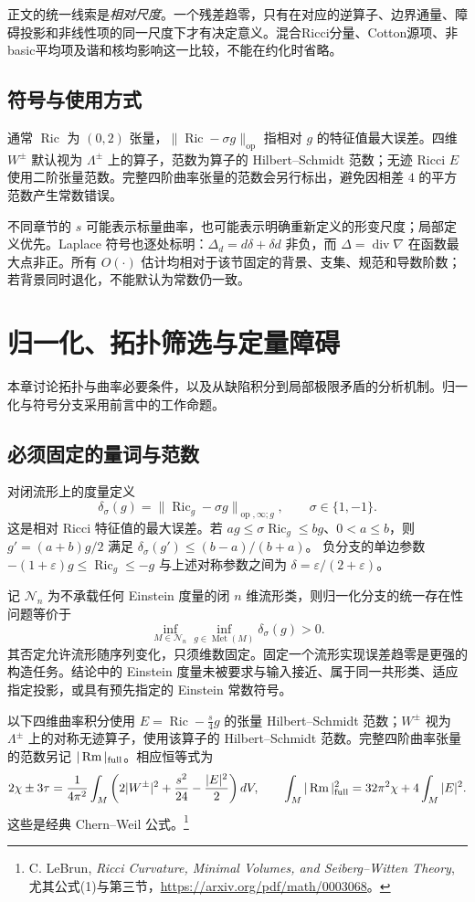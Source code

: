 \documentclass[UTF8,fontset=fandol,zihao=-4,oneside,openany]{ctexbook}
\theoremstyle{cjkplain}
\numberwithin{equation}{chapter}
\DeclareMathOperator{\Ric}{Ric}
\DeclareMathOperator{\Rm}{Rm}
\begin{document}
正文的统一线索是\emph{相对尺度}。一个残差趋零，只有在对应的逆算子、边界通量、障碍投影和非线性项的同一尺度下才有决定意义。混合Ricci分量、Cotton源项、非basic平均项及谐和核均影响这一比较，不能在约化时省略。

\section*{符号与使用方式}
通常 $\Ric$ 为 $(0,2)$ 张量，$\|\Ric-\sigma g\|_{\mathrm{op}}$ 指相对 $g$ 的特征值最大误差。四维 $W^\pm$ 默认视为 $\Lambda^\pm$ 上的算子，范数为算子的 Hilbert--Schmidt 范数；无迹 Ricci $E$ 使用二阶张量范数。完整四阶曲率张量的范数会另行标出，避免因相差 $4$ 的平方范数产生常数错误。

不同章节的 $s$ 可能表示标量曲率，也可能表示明确重新定义的形变尺度；局部定义优先。Laplace 符号也逐处标明：$\Delta_d=d\delta+\delta d$ 非负，而 $\Delta=\operatorname{div}\nabla$ 在函数最大点非正。所有 $O(\cdot)$ 估计均相对于该节固定的背景、支集、规范和导数阶数；若背景同时退化，不能默认为常数仍一致。


\tableofcontents
\mainmatter


\chapter{归一化、拓扑筛选与定量障碍}\label{FND:chapter}
本章讨论拓扑与曲率必要条件，以及从缺陷积分到局部极限矛盾的分析机制。归一化与符号分支采用前言中的工作命题。

\section{必须固定的量词与范数}
对闭流形上的度量定义
\[
\delta_\sigma(g)=\|\Ric_g-\sigma g\|_{\operatorname{op},\infty;g},
\qquad \sigma\in\{1,-1\}.
\]
这是相对 Ricci 特征值的最大误差。若
\(ag\le \sigma\Ric_g\le bg\)、\(0<a\le b\)，则
\(g'=(a+b)g/2\) 满足
\(\delta_\sigma(g')\le(b-a)/(b+a)\)。
负分支的单边参数
\(-(1+\varepsilon)g\le\Ric_g\le-g\) 与上述对称参数之间为
\(\delta=\varepsilon/(2+\varepsilon)\)。

记 \(\mathcal N_n\) 为不承载任何 Einstein 度量的闭 \(n\) 维流形类，则归一化分支的统一存在性问题等价于
\[
\inf_{M\in\mathcal N_n}\inf_{g\in\operatorname{Met}(M)}
\delta_\sigma(g)>0.
\]
其否定允许流形随序列变化，只须维数固定。固定一个流形实现误差趋零是更强的构造任务。结论中的 Einstein 度量未被要求与输入接近、属于同一共形类、适应指定投影，或具有预先指定的 Einstein 常数符号。

以下四维曲率积分使用
\(E=\Ric-\frac{s}{4}g\) 的张量 Hilbert--Schmidt 范数；\(W^\pm\) 视为 \(\Lambda^\pm\) 上的对称无迹算子，使用该算子的 Hilbert--Schmidt 范数。完整四阶曲率张量的范数另记 \(|\Rm|_{\rm full}\)。相应恒等式为
\begin{equation}\label{FND:CW}
2\chi\pm3\tau=\frac1{4\pi^2}\int_M
\left(2|W^\pm|^2+\frac{s^2}{24}-\frac{|E|^2}{2}\right)dV,
\qquad
\int_M|\Rm|_{\rm full}^2=32\pi^2\chi+4\int_M|E|^2.
\end{equation}
这些是经典 Chern--Weil 公式。\footnote{C. LeBrun, \emph{Ricci Curvature, Minimal Volumes, and Seiberg--Witten Theory}, 尤其公式(1)与第三节，\url{https://arxiv.org/pdf/math/0003068}。}
\end{document}
